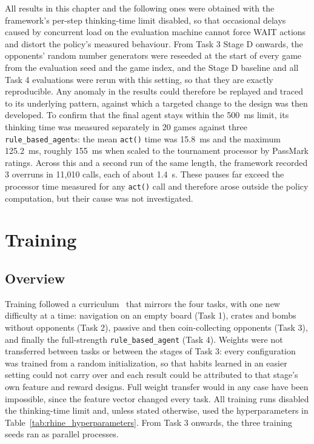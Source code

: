 \documentclass[11pt,a4paper]{report}
\begin{document}
	All results in this chapter and the following ones were obtained with the framework's per-step thinking-time limit disabled, so that occasional delays caused by concurrent load on the evaluation machine cannot force WAIT actions and distort the policy's measured behaviour. From Task 3 Stage D onwards, the opponents' random number generators were reseeded at the start of every game from the evaluation seed and the game index, and the Stage D baseline and all Task 4 evaluations were rerun with this setting, so that they are exactly reproducible. Any anomaly in the results could therefore be replayed and traced to its underlying pattern, against which a targeted change to the design was then developed. To confirm that the final agent stays within the 500~ms limit, its thinking time was measured separately in 20 games against three \texttt{rule\_based\_agent}s: the mean \texttt{act()} time was 15.8~ms and the maximum 125.2~ms, roughly 155~ms when scaled to the tournament processor by PassMark ratings. Across this and a second run of the same length, the framework recorded 3 overruns in 11{,}010 calls, each of about 1.4~s. These pauses far exceed the processor time measured for any \texttt{act()} call and therefore arose outside the policy computation, but their cause was not investigated.
	
	
	\chapter{Training}
	\label{chap:training}
	\label{sec:rhine_training}
	
	\section{Overview}
	\label{subsec:rhine_training_overview}
	
	Training followed a curriculum~\cite{bengio2009curriculum} that mirrors the four tasks, with one new difficulty at a time: navigation on an empty board (Task 1), crates and bombs without opponents (Task 2), passive and then coin-collecting opponents (Task 3), and finally the full-strength \texttt{rule\_based\_agent} (Task 4). Weights were not transferred between tasks or between the stages of Task 3: every configuration was trained from a random initialization, so that habits learned in an easier setting could not carry over and each result could be attributed to that stage's own feature and reward designs. Full weight transfer would in any case have been impossible, since the feature vector changed every task. All training runs disabled the thinking-time limit and, unless stated otherwise, used the hyperparameters in Table~\ref{tab:rhine_hyperparameters}. From Task 3 onwards, the three training seeds ran as parallel processes.
	
\end{document}
